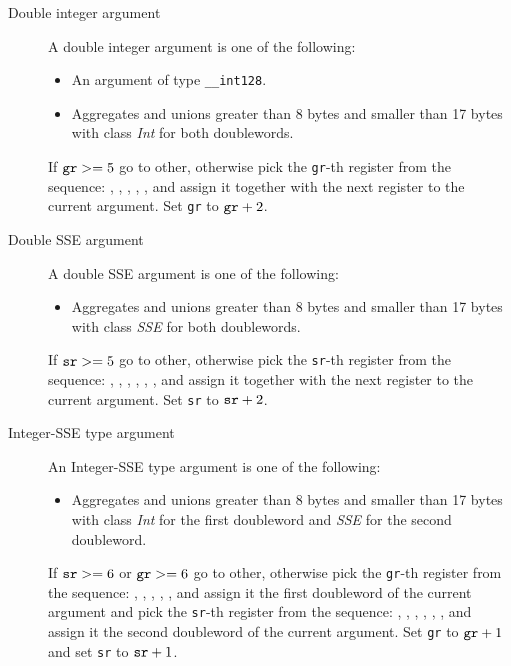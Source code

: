 \begin{description}
\begin{description}
    \item[Double integer argument]
      A double integer argument is one of the following:
      \begin{itemize}
        \item An argument of type \verb|__int128|.
        \item Aggregates and unions greater than 8 bytes and smaller
          than 17 bytes with class \emph{Int} for both doublewords.
      \end{itemize}
      If $\verb|gr| >= 5$ go to other, otherwise pick the \verb|gr|-th register from
      the sequence: \RAX, \RDX, \RCX, \RBX, \RSI, \RDI{} and assign it together with the
      next register to the current argument.
      Set \verb|gr| to $\verb|gr|+2$.

    \item[Double SSE argument]
      A double SSE argument is one of the following:
      \begin{itemize}
        \item Aggregates and unions greater than 8 bytes and smaller
          than 17 bytes with class \emph{SSE} for both doublewords.
      \end{itemize}
      If $\verb|sr| >= 5$ go to other, otherwise pick the \verb|sr|-th
      register from the sequence: , , ,
      , , ,  and assign it
      together with the next register to the current argument.  Set
      \verb|sr| to $\verb|sr|+2$.

    \item[Integer-SSE type argument]
      An Integer-SSE type argument is one of the following:
      \begin{itemize}
        \item Aggregates and unions greater than 8 bytes and smaller
          than 17 bytes with class \emph{Int} for the first doubleword
          and \emph{SSE} for the second doubleword.
      \end{itemize}
      If $\verb|sr| >= 6$ or $\verb|gr| >= 6$ go to other, otherwise
      pick the \verb|gr|-th register from the sequence: \RAX, \RDX,
      \RCX, \RBX, \RSI, \RDI{} and assign it the first doubleword of
      the current argument and pick the \verb|sr|-th register from the
      sequence: , , , ,
      , ,  and assign it the second
      doubleword of the current argument.  Set \verb|gr| to
      $\verb|gr|+1$ and set \verb|sr| to $\verb|sr|+1$.


\end{description}
\end{description}
